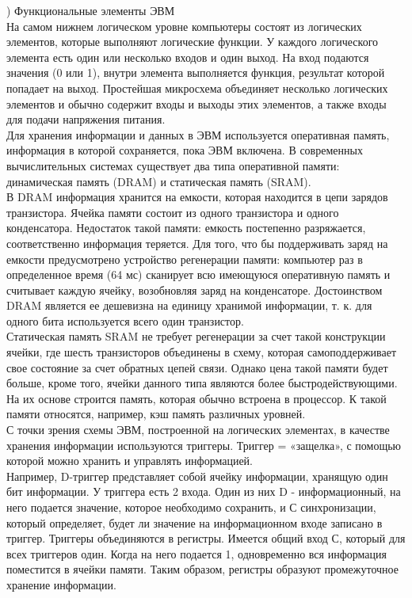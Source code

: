 ) Функциональные элементы ЭВМ \\
На самом нижнем логическом уровне компьютеры состоят из логических элементов, которые выполняют логические функции. У каждого логического элемента есть один или несколько входов и один выход. На вход подаются значения (0 или 1), внутри элемента выполняется функция, результат которой попадает на выход. Простейшая микросхема объединяет несколько логических элементов и обычно содержит входы и выходы этих элементов, а также входы для подачи напряжения питания. \\
Для хранения информации и данных в ЭВМ используется оперативная память, информация в которой сохраняется, пока ЭВМ включена. В современных вычислительных системах существует два типа оперативной памяти: динамическая память (DRAM) и статическая память (SRAM). \\
В DRAM информация хранится на емкости, которая находится в цепи зарядов транзистора. Ячейка памяти состоит из одного транзистора и одного конденсатора. Недостаток такой памяти: емкость постепенно разряжается, соответственно информация теряется. Для того, что бы поддерживать заряд на емкости предусмотрено устройство регенерации памяти: компьютер раз в определенное время (64 мс) сканирует всю имеющуюся оперативную память и считывает каждую ячейку, возобновляя заряд на конденсаторе. Достоинством DRAM является ее дешевизна на единицу хранимой информации, т. к. для одного бита используется всего один транзистор. \\
Статическая память SRAM не требует регенерации за счет такой конструкции ячейки, где шесть транзисторов объединены в схему, которая самоподдерживает свое состояние за счет обратных цепей связи. Однако цена такой памяти будет больше, кроме того, ячейки данного типа являются более быстродействующими. На их основе строится память, которая обычно встроена в процессор. К такой памяти относятся, например, кэш память различных уровней. \\
С точки зрения схемы ЭВМ, построенной на логических элементах, в качестве хранения информации используются триггеры. Триггер = «защелка», с помощью которой можно хранить и управлять информацией. \\
Например, D-триггер представляет собой ячейку информации, хранящую один бит информации. У триггера есть 2 входа. Один из них D - информационный, на него подается значение, которое необходимо сохранить, и С синхронизации, который определяет, будет ли значение на информационном входе записано в триггер. Триггеры объединяются в регистры. Имеется общий вход С, который для всех триггеров один. Когда на него подается 1, одновременно вся информация поместится в ячейки памяти. Таким образом, регистры образуют промежуточное хранение информации. \\

